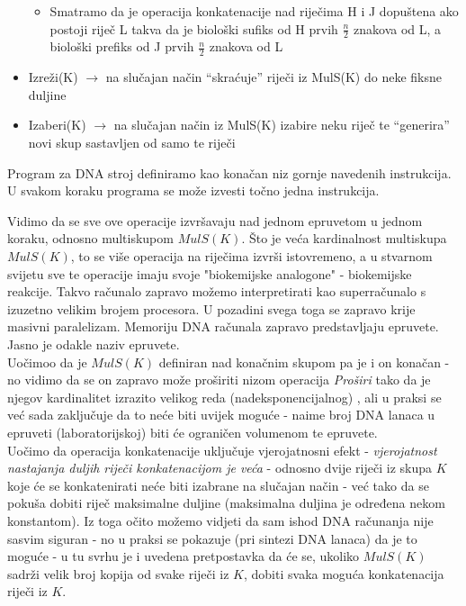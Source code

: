 \documentclass[a4paper,oneside,12pt]{memoir} %
\begin{document}
\begin{spacing}{1.5}
\begin{defn}
\begin{itemize}
\begin{itemize}
                \item Smatramo da je operacija konkatenacije nad riječima H i J dopuštena ako postoji riječ L takva da je biološki sufiks od H prvih $\frac{n}{2}$  znakova od L, a biološki prefiks od J prvih $\frac{n}{2}$ znakova od L
            \end{itemize}
    \item Izreži(K) $\to$ na slučajan način “skraćuje” riječi iz MulS(K) do neke fiksne duljine
    \item Izaberi(K) $\to$ na slučajan način iz MulS(K) izabire neku riječ te “generira” novi skup sastavljen od samo te riječi

    \end{itemize}
    Program za DNA stroj definiramo kao konačan niz gornje navedenih instrukcija. U svakom koraku programa se može izvesti točno jedna instrukcija.
\end{defn}
\begin{rem}
Vidimo da se sve ove operacije izvršavaju nad jednom epruvetom u jednom koraku, odnosno multiskupom $MulS(K)$. Što je veća kardinalnost multiskupa $MulS(K)$, to se više operacija na riječima izvrši istovremeno, a u stvarnom svijetu sve te operacije imaju svoje "biokemijske analogone" - biokemijske reakcije. Takvo računalo zapravo možemo interpretirati kao superračunalo s izuzetno velikim brojem procesora. U pozadini svega toga se zapravo krije masivni paralelizam. Memoriju DNA računala zapravo predstavljaju epruvete. Jasno je odakle naziv epruvete.\\
Uočimoo da je $MulS(K)$ definiran nad konačnim skupom pa je i on konačan - no vidimo da se on zapravo može proširiti nizom operacija \textit{Proširi} tako da je njegov kardinalitet izrazito velikog reda (nadeksponencijalnog) , ali u praksi se već sada zaključuje da to neće biti uvijek moguće - naime broj DNA lanaca u epruveti (laboratorijskoj) biti će ograničen volumenom te epruvete.\\
Uočimo da operacija konkatenacije uključuje vjerojatnosni efekt - \textit{vjerojatnost nastajanja duljih riječi konkatenacijom je veća} - odnosno dvije riječi iz skupa $K$ koje će se konkatenirati neće biti izabrane na slučajan način - već tako da se pokuša dobiti riječ maksimalne duljine (maksimalna duljina je određena nekom konstantom). Iz toga očito možemo vidjeti da sam ishod DNA računanja nije sasvim siguran  - no u praksi se pokazuje (pri sintezi DNA lanaca) da je to moguće - u tu svrhu je i uvedena pretpostavka da će  se, ukoliko $MulS(K)$ sadrži velik broj kopija od svake riječi iz $K$, dobiti svaka moguća konkatenacija riječi iz $K$.
\end{rem}

\end{spacing}
\end{document}
